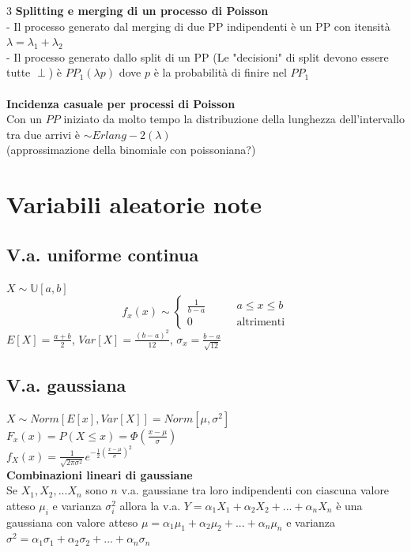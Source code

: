 \documentclass{article}
\begin{document}
\begin{multicols*}{3}
		\textbf{Splitting e merging di un processo di Poisson}\\
		- Il processo generato dal merging di due PP indipendenti è un PP con itensità \(\lambda = \lambda_1 + \lambda_2\)\\
		- Il processo generato dallo split di un PP (Le "decisioni" di split devono essere tutte \(\perp\)) è \(PP_1(\lambda p)\) dove \(p\) è la probabilità di finire nel \(PP_1\)\\\\
		\textbf{Incidenza casuale per processi di Poisson}\\
		Con un \(PP\) iniziato da molto tempo la distribuzione della lunghezza dell'intervallo tra due arrivi è \(\sim Erlang-2(\lambda)\)\\
		(approssimazione della binomiale con poissoniana?)\\
		
		
		
		
		
		
		
		
		\section{Variabili aleatorie note}
		
		\subsection{V.a. uniforme continua}
		\(X \sim \mathbb{U}[a,b] \)\\
		\begin{equation*}
			f_x (x) \sim
			\left\{
			\begin{alignedat}{2}
				\frac{1}{b-a}  & \qquad a\leq x \leq b\\
				0            & \qquad \text{altrimenti}
			\end{alignedat}
			\right.
		\end{equation*}
		\(E[X] = \frac{a+b}{2}\), \(Var[X] = \frac{(b-a)^2}{12}\), \(\sigma_x = \frac{b-a}{\sqrt{12}}\)\\
		
		\subsection{V.a. gaussiana}
		\(X \sim Norm[E[x],Var[X]] = Norm[\mu,\sigma^2]\)\\
		\(F_x(x) = P(X\leq x) = \Phi(\frac{x-\mu}{\sigma})\)\\
		\(f_X(x)= \frac{1}{\sqrt{2\pi \sigma^2}}e^{-\frac{1}{2}(\frac{x-\mu}{\sigma})^2}\)\\
		\textbf{Combinazioni lineari di gaussiane}\\
		Se \(X_1,X_2,...X_n\) sono \(n\) v.a. gaussiane tra loro indipendenti con ciascuna valore atteso \(\mu_i\) e varianza \(\sigma^2_i\) allora la v.a. \(Y= \alpha_1X_1+\alpha_2X_2+...+\alpha_nX_n\) è una gaussiana con valore atteso \(\mu = \alpha_1\mu_1+\alpha_2\mu_2+...+\alpha_n\mu_n\) e varianza \(\sigma^2 = \alpha_1\sigma_1+ \alpha_2\sigma_2+...+\alpha_n\sigma_n\)
		

\end{multicols*}
\end{document}
